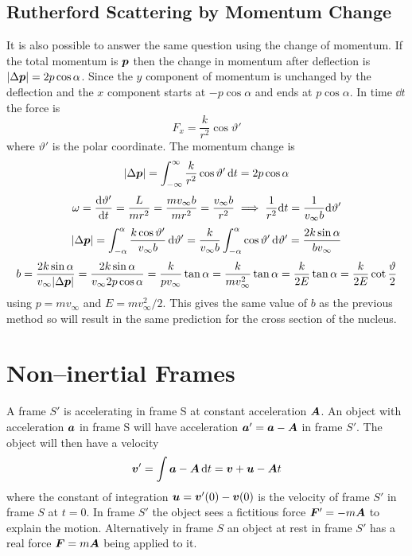 \documentclass{article}
\begin{document}
    \subsection{Rutherford Scattering by Momentum Change}
    It is also possible to answer the same question using the change of momentum.
    If the total momentum is \(\bm{p}\) then the change in momentum after deflection is \(|\Delta\bm{p}| = 2p\cos\alpha\).
    Since the \(y\) component of momentum is unchanged by the deflection and the \(x\) component starts at \(-p\cos\alpha\) and ends at \(p\cos\alpha\).
    In time \(\dd t\) the force is
    \[F_x = \frac{k}{r^2}\cos\vartheta'\]
    where \(\vartheta'\) is the polar coordinate.
    The momentum change is
    \[|\Delta\bm{p}| = \int_{-\infty}^\infty \frac{k}{r^2}\cos\vartheta'\,\dd t = 2p\cos\alpha\]
    \[\omega = \dv{\vartheta'}{t} = \frac{L}{mr^2} = \frac{mv_\infty b}{mr^2} = \frac{v_\infty b}{r^2} \implies \frac{1}{r^2}\dd t = \frac{1}{v_\infty b}\dd\vartheta'\]
    \[|\Delta\bm{p}| = \int_{-\alpha}^\alpha \frac{k\cos\vartheta'}{v_\infty b}\,\dd\vartheta ' = \frac{k}{v_\infty b}\int_{-\alpha}^\alpha \cos\vartheta' \,\dd\vartheta' = \frac{2k\sin\alpha}{bv_\infty}\]
    \[b = \frac{2k\sin\alpha}{v_\infty|\Delta\bm{p}|} = \frac{2k\sin\alpha}{v_\infty2p\cos\alpha} = \frac{k}{pv_\infty}\tan\alpha = \frac{k}{mv_\infty^2}\tan\alpha = \frac{k}{2E}\tan\alpha = \frac{k}{2E}\cot\frac{\vartheta}{2}\]
    using \(p = mv_\infty\) and \(E = mv_\infty^2/2\).
    This gives the same value of \(b\) as the previous method so will result in the same prediction for the cross section of the nucleus.
    
    \section{Non--inertial Frames}
    A frame \(S'\) is accelerating in frame S at constant acceleration \(\bm{A}\).
    An object with acceleration \(\bm{a}\) in frame S will have acceleration \(\bm{a}' = \bm{a} - \bm{A}\) in frame \(S'\).
    The object will then have a velocity
    \[\bm{v}' = \int \bm{a} - \bm{A}\,\dd t = \bm{v} + \bm{u} - \bm{A}t\]
    where the constant of integration \(\bm{u} = \bm{v}'(0) - \bm{v}(0)\) is the velocity of frame \(S'\) in frame \(S\) at \(t = 0\).
    In frame \(S'\) the object sees a fictitious force \(\bm{F}' = -m\bm{A}\) to explain the motion.
    Alternatively in frame \(S\) an object at rest in frame \(S'\) has a real force \(\bm{F} = m\bm{A}\) being applied to it.
    
\end{document}
